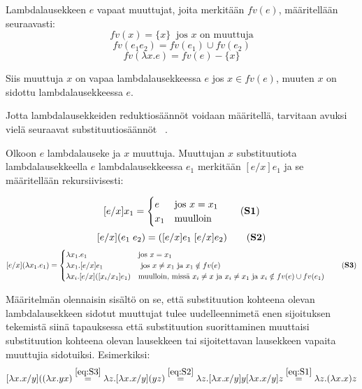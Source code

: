 \begin{maar}
Lambdalausekkeen $e$ vapaat muuttujat, joita merkitään $fv(e)$, määritellään seuraavasti: 
\[fv(x) = \{x\}\ \text{ jos } x \text{ on muuttuja} \]
\[fv(e_{1}e_{2}) = fv(e_{1}) \cup fv(e_{2}) \]
\[ fv(\lambda x.e) = fv(e) - \{x\} \]

Siis muuttuja $x$ on vapaa lambdalausekkeessa $e$ jos $x \in fv(e)$, muuten $x$ on sidottu lambdalausekkeessa $e$.
\end{maar} 
\par
Jotta lambdalausekkeiden reduktiosäännöt voidaan määritellä, tarvitaan avuksi vielä seuraavat substituutiosäännöt ~\cite[s.~8]{Hudak89}.

\begin{maar}[substituutiosäännöt]
Olkoon $e$ lambdalauseke ja $x$ muuttuja. Muuttujan $x$ substituutiota lambdalausekkeella $e$ lambdalausekkeessa $e_{1}$ merkitään $[e/x] e_{1}$ ja se määritellään rekursiivisesti:  

\[[e/x]x_{1} = 
        \begin{cases}
                e & \text{jos } x = x_{1} \\
                x_{1} & \text{muulloin}
        \end{cases}
        \label{eq:S1} \tag{\textbf{S1}}
\]
\[ [e/x](e_{1} \; e_{2}) = ([e/x]e_{1} \; [e/x]e_{2}) \label{eq:S2} \tag{\textbf{S2}}\]
\[[e/x](\lambda x_{1}.e_{1}) = 
        \begin{cases}
                \lambda x_{1}.e_{1} & \text{jos } x = x_{1} \\
                \lambda x_{1}.[e/x]e_{1} & \text{ jos } x \neq x_{1} \text{ ja } x_{1} \notin fv(e) \\
                \lambda x_{i}.[e/x]([x_{i}/x_{1}]e_{1}) & \text{muulloin, missä } x_{i} \neq x \text { ja } x_{i} \neq x_{1} \text{ ja } x_{i} \notin fv(e) \cup fv(e_{1})
        \end{cases}
 \label{eq:S3} \tag{\textbf{S3}}       
\]
\end{maar} 

Määritelmän olennaisin sisältö on se, että substituution kohteena olevan lambdalausekkeen sidotut muuttujat tulee uudelleennimetä enen sijoituksen tekemistä siinä tapauksessa että substituution suorittaminen muuttaisi substituution kohteena olevan lausekkeen tai sijoitettavan lausekkeen vapaita muuttujia sidotuiksi. Esimerkiksi: \\

\[ [\lambda x . x / y]((\lambda x . yx)  \stackrel{\eqref{eq:S3}}{=} \\ 
	\lambda z . [\lambda x . x / y](yz) \stackrel{\eqref{eq:S2}}{=} \\
	\lambda z . [\lambda x . x / y]y [\lambda x . x / y]z \stackrel{\eqref{eq:S1}}{=} \lambda z . (\lambda x . x) z	
\]   

